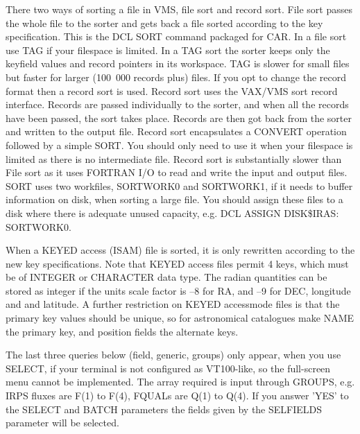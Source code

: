 There two ways of sorting a file in VMS, file sort and record sort.
File sort passes the whole file to the sorter and gets back a  file sorted  
according  to  the  key  specification.  
This is the DCL SORT command packaged for CAR.
In a file sort use TAG if your filespace is limited. 
In a TAG sort the sorter keeps only the keyfield values and record pointers 
in its workspace.  
TAG is slower for small files but faster for larger (100~000 records plus) 
files.
If you opt to change the record format then a record sort is used.
Record sort uses the VAX/VMS sort record interface.   
Records are passed individually to the sorter, and when all the records have 
been passed, the sort takes place.  
Records are then got back from the sorter and written to the output file.
Record sort encapsulates a CONVERT operation followed by a simple SORT.
You should only need to use it when your filespace is limited as there is no 
intermediate file.
Record sort is substantially slower than File sort as it uses FORTRAN I/O 
to read and write the input and output files.
SORT uses two workfiles, SORTWORK0 and SORTWORK1, if it needs to buffer 
information on disk, when sorting a large file. 
You should assign these files to a disk where there is adequate unused 
capacity, e.g. DCL ASSIGN DISK\$IRAS: SORTWORK0.

When a KEYED access (ISAM) file is sorted, it is only rewritten according 
to the new key specifications.  
Note that KEYED access files permit 4 keys, which must be of INTEGER or 
CHARACTER data type.  
The radian quantities can be stored as integer if the units scale factor is 
--8 for RA, and --9 for DEC, longitude and and latitude.  
A further restriction on KEYED accessmode files is that the primary key 
values should be unique, so for astronomical catalogues make NAME the 
primary key, and position fields the alternate keys.

The last three queries below (field, generic, groups) only appear, when you use
SELECT, if your terminal is not configured as VT100-like, so the full-screen 
menu cannot be implemented.
The array required is input through GROUPS, e.g. IRPS fluxes are F(1) to 
F(4), FQUALs are Q(1) to Q(4).
If you answer 'YES' to the SELECT and BATCH parameters the fields given by the
SELFIELDS parameter will be selected.

